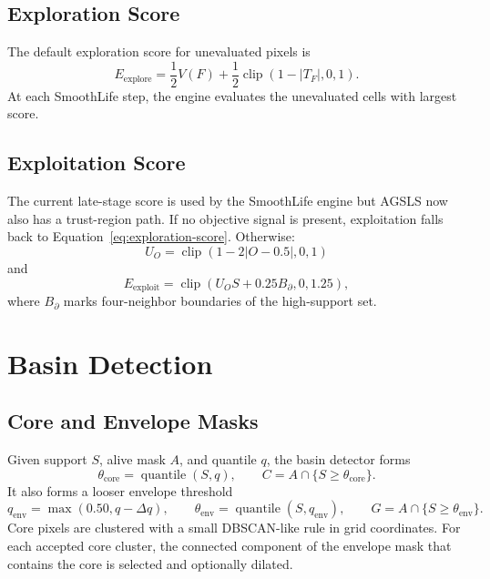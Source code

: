 \documentclass[11pt]{article}
\newcommand{\clip}{\operatorname{clip}}
\begin{document}
\subsection{Exploration Score}

The default exploration score for unevaluated pixels is
\begin{equation}
E_{\mathrm{explore}}
=\frac{1}{2}V(F)+\frac{1}{2}\clip(1-|T_F|,0,1).
\label{eq:exploration-score}
\end{equation}
At each SmoothLife step, the engine evaluates the unevaluated cells with
largest score.

\subsection{Exploitation Score}

The current late-stage score is used by the SmoothLife engine but AGSLS now
also has a trust-region path. If no objective signal is present, exploitation
falls back to Equation~\eqref{eq:exploration-score}. Otherwise:
\begin{equation}
U_O = \clip(1 - 2|O-0.5|,0,1)
\label{eq:objective-uncertainty}
\end{equation}
and
\begin{equation}
E_{\mathrm{exploit}}
= \clip(U_O S + 0.25 B_{\partial},0,1.25),
\label{eq:exploitation-score}
\end{equation}
where $B_{\partial}$ marks four-neighbor boundaries of the high-support set.

\section{Basin Detection}

\subsection{Core and Envelope Masks}

Given support $S$, alive mask $A$, and quantile $q$, the basin detector forms
\begin{equation}
\theta_{\mathrm{core}}=\operatorname{quantile}(S,q),
\qquad
C = A \cap \{S\ge\theta_{\mathrm{core}}\}.
\label{eq:basin-core}
\end{equation}
It also forms a looser envelope threshold
\begin{equation}
q_{\mathrm{env}} = \max(0.50,q-\Delta q),
\qquad
\theta_{\mathrm{env}}=\operatorname{quantile}(S,q_{\mathrm{env}}),
\qquad
G = A\cap\{S\ge\theta_{\mathrm{env}}\}.
\label{eq:basin-envelope}
\end{equation}
Core pixels are clustered with a small DBSCAN-like rule in grid coordinates.
For each accepted core cluster, the connected component of the envelope mask
that contains the core is selected and optionally dilated.
\end{document}
